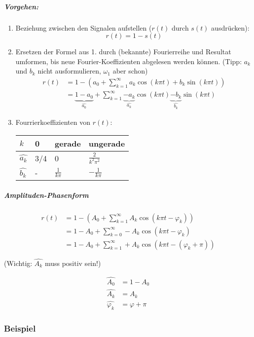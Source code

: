 \subparagraph{Vorgehen:}
\begin{enumerate}
	\item Beziehung zwischen den Signalen aufstellen ($r(t)$ durch $s(t)$ ausdrücken): \[
			r(t) = 1-s(t)  
		\]
	\item Ersetzen der Formel aus 1. durch (bekannte) Fourierreihe und Resultat umformen, bis neue Fourier-Koeffizienten abgelesen werden können. (Tipp: $a_k$ und $b_k$ nicht ausformulieren, $\omega_1$ aber schon) \begin{align*}
			r(t) &= 1- \left( a_0 + \sum^\infty_{k=1} a_k \cos(k \pi t) + b_k \sin(k \pi t)\right) \\
			&= \underbrace{1 - a_0}_{\widehat{a_0}} + \sum^\infty_{k=1} \underbrace{-a_k}_{\widehat{a_k}} \cos(k \pi t) \underbrace{- b_k}_{\widehat{b_k}} \sin(k \pi t)
		\end{align*}
	\item Fourrierkoeffizienten von $r(t)$: 
	
	  \begin{tabu}{l | l | l | l}
			$k$ & 0 & gerade & ungerade \\ \hline
			$\widehat{a_k}$ & 3/4 & 0 & $\frac{2}{k^2 \pi^2}$ \\ \hline
			$\widehat{b_k}$ & - & $\frac{1}{k \pi}$ & $-\frac{1}{k \pi}$
		\end{tabu}
\end{enumerate}

\subparagraph{Amplituden-Phasenform}


\begin{align*}
	r(t) &= 1 - \left( A_0 + \sum^\infty_{k=1} A_k \cos(k \pi t - \varphi_k) \right) \\
		&= 1 - A_0 + \sum^\infty_{k=0} - A_k \cos(k \pi t - \varphi_k) \\
		&= 1 - A_0 + \sum^\infty_{k=1} + A_k \cos(k \pi t - (\varphi_k + \pi))
\end{align*}

(Wichtig: $\widehat{A_k}$ muss positiv sein!)

\begin{align*}
	\widehat{A_0} &= 1 - A_0 \\
	\widehat{A_k} &= A_k \\
	\widehat{\varphi_k} &= \varphi + \pi
\end{align*}


\subsubsection{Beispiel}


